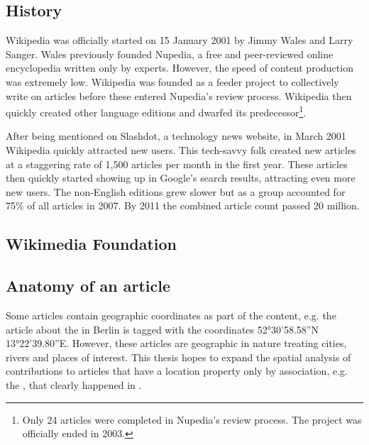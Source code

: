 \subsection{History \cite{wphistory}}

Wikipedia was officially started on 15 January 2001 by Jimmy Wales and Larry Sanger.
Wales previously founded Nupedia, a free and peer-reviewed online encyclopedia written only by experts.
However, the speed of content production was extremely low.
Wikipedia was founded as a feeder project to collectively write on articles before these entered Nupedia's review process.
Wiki\-pedia then quickly created other language editions and dwarfed its predecessor\footnote{Only 24 articles were completed in Nupedia's review process. The project was officially ended in 2003.}.

After being mentioned on Slashdot, a technology news website, in March 2001 Wikipedia quickly attracted new users.
This tech-savvy folk created new articles at a staggering rate of 1,500 articles per month in the first year.
These articles then quickly started showing up in Google's search results, attracting even more new users.
The non-English editions grew slower but as a group accounted for 75\% of all articles in 2007.
By 2011 the combined article count passed 20 million.

\subsection{Wikimedia Foundation}\label{sub:wmf}


\subsection{Anatomy of an article}\label{sub:article}



Some articles contain geographic coordinates as part of the content, e.g. the article about the  in Berlin is tagged with the coordinates 52°30'58.58''N 13°22'39.80''E.
However, these articles are geographic in nature treating cities, rivers and places of interest. 
This thesis hopes to expand the spatial analysis of contributions to articles that have a location property only by association, e.g. the , that clearly happened in .


